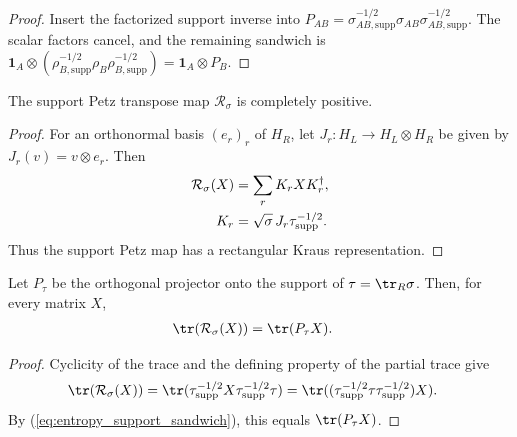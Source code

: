 \begin{proof}\leanok
    Insert the factorized support inverse into
    $P_{AB}=\sigma_{AB,\mathrm{supp}}^{-1/2}
    \sigma_{AB}\sigma_{AB,\mathrm{supp}}^{-1/2}$. The scalar factors cancel,
    and the remaining sandwich is
    $\mathbf 1_A\otimes
    (\rho_{B,\mathrm{supp}}^{-1/2}\rho_B
    \rho_{B,\mathrm{supp}}^{-1/2})=\mathbf 1_A\otimes P_B$.
\end{proof}

\begin{theorem}
    \label{thm:partial_trace_support_petz_map_cp}
    \leanok
    The support Petz transpose map $\mathcal R_\sigma$ is completely positive.
\end{theorem}

\begin{proof}\leanok
    For an orthonormal basis $(e_r)_r$ of $H_R$, let
    $J_r:H_L\to H_L\otimes H_R$ be given by $J_r(v)=v\otimes e_r$. Then
    \begin{align}
        \mathcal R_\sigma(X)
        &=\sum_r K_rXK_r^\dagger,
        \notag\\
        K_r
        &=\sqrt\sigma\,J_r\tau^{-1/2}_{\mathrm{supp}}.
        \notag
    \end{align}
    Thus the support Petz map has a rectangular Kraus representation.
\end{proof}

\begin{lemma}
    \label{lem:partial_trace_support_petz_map_trace}
    \leanok
    Let $P_\tau$ be the orthogonal projector onto the support of
    $\tau=\tr_R\sigma$. Then, for every matrix $X$,
    \begin{align}
        \tr(\mathcal R_\sigma(X))
        &=\tr(P_\tau X).
        \label{eq:entropy_support_petz_trace}
    \end{align}
\end{lemma}

\begin{proof}\leanok
    Cyclicity of the trace and the defining property of the partial trace give
    \begin{align}
        \tr(\mathcal R_\sigma(X))
        &=\tr(\tau^{-1/2}_{\mathrm{supp}}
          X\tau^{-1/2}_{\mathrm{supp}}\tau)
          =\tr((\tau^{-1/2}_{\mathrm{supp}}
          \tau\tau^{-1/2}_{\mathrm{supp}})X).
        \notag
    \end{align}
    By (\ref{eq:entropy_support_sandwich}), this equals $\tr(P_\tau X)$.
\end{proof}

